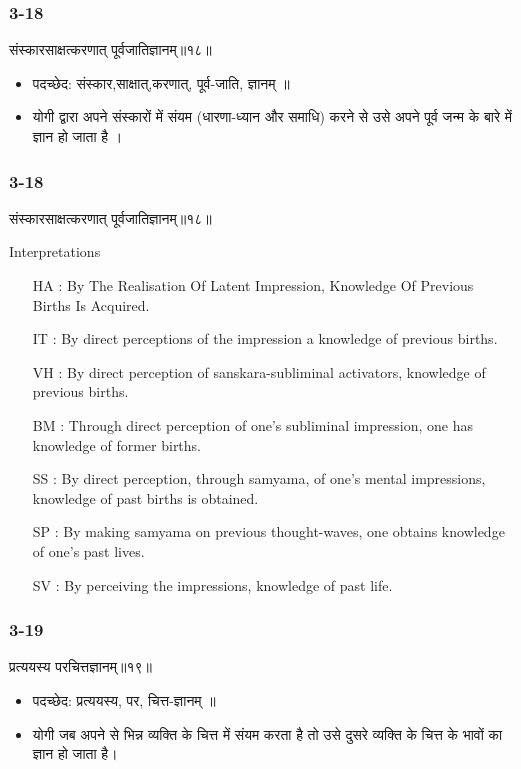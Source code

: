 \begin{frame}[fragile]\frametitle{3-18}
\begin{sanskrit}
संस्कारसाक्षत्करणात् पूर्वजातिज्ञानम्॥१८॥
\end{sanskrit}

\begin{itemize}
\item पदच्छेद:  संस्कार,साक्षात्,करणात्, पूर्व-जाति, ज्ञानम् ॥
\item  योगी द्वारा अपने संस्कारों में संयम (धारणा-ध्यान और समाधि) करने से उसे अपने पूर्व जन्म के बारे में ज्ञान हो जाता है ।
\end{itemize}
\end{frame}


\begin{frame}[fragile]\frametitle{3-18}
\begin{sanskrit}
संस्कारसाक्षत्करणात् पूर्वजातिज्ञानम्॥१८॥
\end{sanskrit}

Interpretations
\begin{itemize}	
\item [HA]: By The Realisation Of Latent Impression, Knowledge Of Previous Births Is Acquired.
\item [IT]: By direct perceptions of the impression a knowledge of previous births.
\item [VH]: By direct perception of sanskara-subliminal activators, knowledge of previous births.
\item [BM]: Through direct perception of one’s subliminal impression, one has knowledge of former births.
\item [SS]: By direct perception, through samyama, of one’s mental impressions, knowledge of past births is obtained.
\item [SP]: By making samyama on previous thought-waves, one obtains knowledge of one’s past lives.
\item [SV]: By perceiving the impressions, knowledge of past life. 
\end{itemize}
\end{frame}

\begin{frame}[fragile]\frametitle{3-19}
\begin{sanskrit}
प्रत्ययस्य परचित्तज्ञानम्॥१९॥
\end{sanskrit}

\begin{itemize}
\item पदच्छेद:  प्रत्ययस्य, पर, चित्त-ज्ञानम् ॥
\item योगी जब अपने से भिन्न व्यक्ति के चित्त में संयम करता है तो उसे दुसरे व्यक्ति के चित्त के भावों का ज्ञान हो जाता है।
\end{itemize}
\end{frame}

